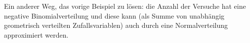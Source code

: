\begin{exercise}
Ein anderer Weg, das vorige Beispiel zu lösen: die Anzahl der Versuche hat eine
negative Binomialverteilung und diese kann (als Summe von unabhängig geometrisch
verteilten Zufallsvariablen) auch durch eine Normalverteilung approximiert werden.
\end{exercise}
\begin{solution}
\end{solution}
